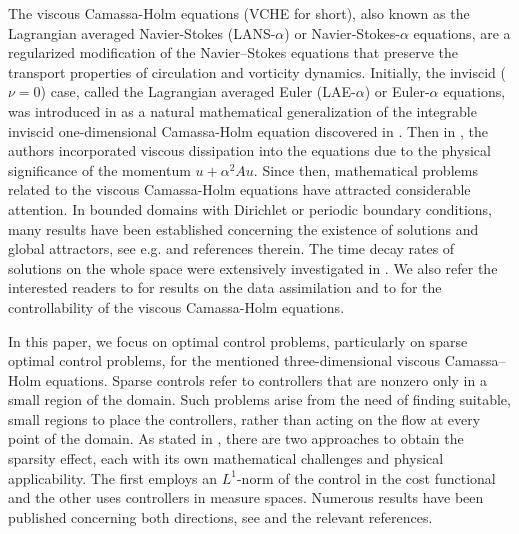 \documentclass[reqno]{amsart}
\begin{document}
	The viscous Camassa-Holm equations (VCHE for short), also known as the Lagrangian averaged Navier-Stokes (LANS-$\alpha$) or Navier-Stokes-$\alpha$ equations, are a regularized modification of the Navier–Stokes equations that preserve the transport properties of circulation and vorticity dynamics. Initially, the inviscid ($\nu=0$) case, called the Lagrangian averaged Euler (LAE-$\alpha$) or Euler-$\alpha$ equations, was introduced in \cite{Holm} as a natural mathematical generalization of the integrable inviscid one-dimensional Camassa-Holm equation discovered in \cite{Camassa}. Then in \cite{Foias2002}, the authors incorporated viscous dissipation into the equations due to the physical significance of the momentum $u+\alpha^2Au$. Since then, mathematical problems related to the viscous Camassa-Holm equations have attracted considerable attention. In bounded domains with Dirichlet or periodic boundary conditions, many results have been established concerning the existence of solutions and global attractors, see e.g. \cite{Coutand, Foias2002, Ilyn2003, Kim2006, Marsden2001, Vishik2007} and references therein. The time decay rates of solutions on the whole space were extensively investigated in \cite{AT2017, schonbek2008, Gao2022, Zhao}. We also refer the interested readers to \cite{Albanez2016, AnhBach, Korn2009} for results on the data assimilation and to \cite{Gao2016, Mitra} for the controllability of the viscous Camassa-Holm equations. 
	
	In this paper, we focus on optimal control problems, particularly on sparse optimal control problems, for the mentioned three-dimensional viscous Camassa–Holm equations. Sparse controls refer to controllers that are nonzero only in a small region of the domain. Such problems arise from the need of finding suitable, small regions to place the controllers, rather than acting on the flow at every point of the domain. As stated in \cite{casas2017}, there are two approaches to obtain the sparsity effect, each with its own mathematical challenges and physical applicability. The first employs an $L^1$-norm of the control in the cost functional and the other uses controllers in measure spaces. Numerous results have been published concerning both directions, see \cite{casas2017,CHW2012,CHW2017,CK2013,CK2016,CK2011,KPV2014,PV2013} and the relevant references.
	
\end{document}
